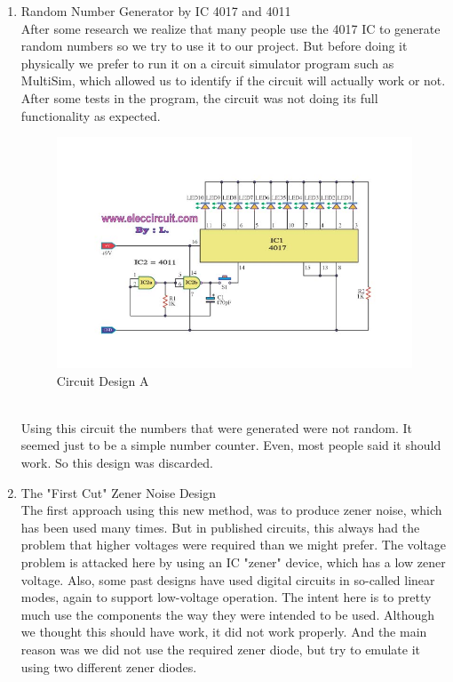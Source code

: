\documentclass[twocolumn]{IEEEtran}
\begin{document}
\begin{enumerate} 
	\item Random Number Generator by IC 4017 and 4011\\
    
    After some research we realize that many people use the 4017 IC to generate random numbers so we try to use it to our project. But before doing it physically we prefer to run it on a circuit simulator program such as MultiSim, which allowed us to identify if the circuit will actually work or not. After some tests in the program, the circuit was not doing its full functionality as expected.
    \begin{figure}[h!]
	\centering
	\includegraphics[width=\columnwidth]{src/Rand_V1.jpg}
	\caption{Circuit Design A}
	\end{figure}\\
    
    Using this circuit the numbers that were generated were not random. It seemed just to be a simple number counter. Even, most people said it should work. So this design was discarded.\\
    
    \item The "First Cut" Zener Noise Design\\
    
    The first approach using this new method, was to produce zener noise, which has been used many times. But in published circuits, this always had the problem that higher voltages were required than we might prefer. The voltage problem is attacked here by using an IC "zener" device, which has a low zener voltage. Also, some past designs have used digital circuits in so-called linear modes, again to support low-voltage operation. The intent here is to pretty much use the components the way they were intended to be used. Although we thought this should have work, it did not work properly. And the main reason was we did not use the required zener diode, but try to emulate it using two different zener diodes.
    

\end{enumerate}
\end{document}
